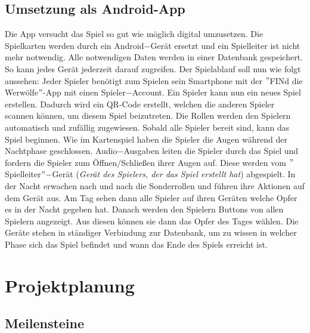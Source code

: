 \documentclass[12pt, a4paper]{article}
\begin{document}
	\subsection{Umsetzung als Android-App}
Die App versucht das Spiel so gut wie möglich digital umzusetzen. Die Spielkarten werden durch ein Android$-$Gerät ersetzt und ein Spielleiter ist nicht mehr notwendig. Alle notwendigen Daten werden in einer Datenbank gespeichert. So kann jedes Gerät jederzeit darauf zugreifen.
Der Spielablauf soll nun wie folgt aussehen: 
Jeder Spieler benötigt zum Spielen sein Smartphone mit der $"$FINd die Werwölfe$"$-App mit einen Spieler$-$Account. Ein Spieler kann nun ein neues Spiel erstellen. Dadurch wird ein QR-Code erstellt, welchen die anderen Spieler scannen können, um diesem Spiel beizutreten. Die Rollen werden den Spielern automatisch und zufällig zugewiesen. Sobald alle Spieler bereit sind, kann das Spiel beginnen. Wie im Kartenspiel haben die Spieler die Augen während der Nachtphase geschlossen. Audio$-$Ausgaben leiten die Spieler durch das Spiel und fordern die Spieler zum Öffnen$/$Schließen ihrer Augen auf. Diese werden vom $"$Spielleiter$"-$Gerät (\textit{Gerät des Spielers, der das Spiel erstellt hat}) abgespielt. In der Nacht erwachen nach und nach die Sonderrollen und führen ihre Aktionen auf dem Gerät aus. Am Tag sehen dann alle Spieler auf ihren Geräten welche Opfer es in der Nacht gegeben hat. Danach werden den Spielern Buttons von allen Spielern angezeigt. Aus diesen können sie dann das Opfer des Tages wählen.
Die Geräte stehen in ständiger Verbindung zur Datenbank, um zu wissen in welcher Phase sich das Spiel befindet und wann das Ende des Spiels erreicht ist. 


\newpage
\section{Projektplanung}
	
	\subsection{Meilensteine}
		
\end{document}
